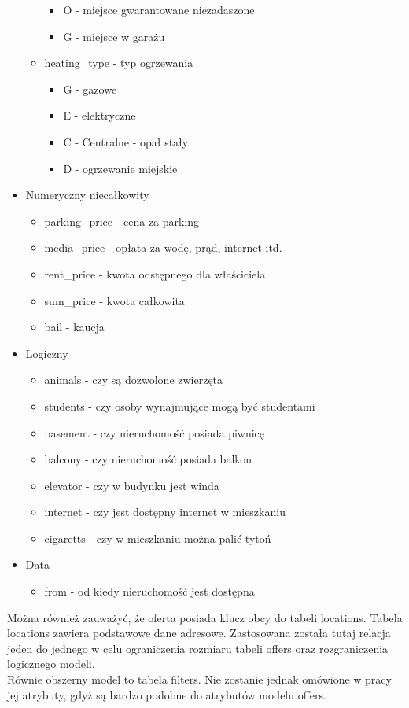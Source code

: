 \begin{itemize}
\begin{itemize}
\begin{itemize}
\item O - miejsce gwarantowane niezadaszone
\item G - miejsce w garażu
\end{itemize} 
\item heating\_type - typ ogrzewania
\begin{itemize}
\item G - gazowe
\item E - elektryczne
\item C - Centralne - opał stały
\item D - ogrzewanie miejskie
\end{itemize}
\end{itemize}
\item Numeryczny niecałkowity
\begin{itemize}
\item parking\_price - cena za parking
\item media\_price - opłata za wodę, prąd, internet itd.
\item rent\_price - kwota odstępnego dla właściciela 
\item sum\_price - kwota całkowita
\item bail - kaucja
\end{itemize}
\item Logiczny
\begin{itemize}
\item animals - czy są dozwolone zwierzęta
\item students - czy osoby wynajmujące mogą być studentami
\item basement - czy nieruchomość posiada piwnicę
\item balcony - czy nieruchomość posiada balkon
\item elevator - czy w budynku jest winda
\item internet - czy jest dostępny internet w mieszkaniu
\item cigaretts - czy w mieszkaniu można palić tytoń
\end{itemize}
\item Data
\begin{itemize}
\item from - od kiedy nieruchomość jest dostępna
\end{itemize}
\end{itemize} 
Można również zauważyć, że oferta posiada klucz obcy do tabeli locations. Tabela locations zawiera podstawowe dane adresowe. Zastosowana została tutaj relacja jeden do jednego w celu ograniczenia rozmiaru tabeli offers oraz rozgraniczenia logicznego modeli.\\
Równie obszerny model to tabela filters. Nie zostanie jednak omówione w pracy jej atrybuty, gdyż są bardzo podobne do atrybutów modelu offers.
